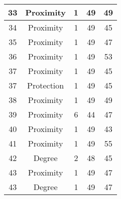 \documentclass[results.tex]{subfiles}
\begin{document}
\begin{center}
\begin{tabular}{| c || c | c | c | c |}
            \hline
            33                      & Proximity                    & 1                      & 49                      & 49                   \\
            \hline
            34                      & Proximity                    & 1                      & 49                      & 45                   \\
            \hline
            35                      & Proximity                    & 1                      & 49                      & 47                   \\
            \hline
            36                      & Proximity                    & 1                      & 49                      & 53                   \\
            \hline
            37                      & Proximity                    & 1                      & 49                      & 45                   \\
            \hline
            37                      & Protection                   & 1                      & 49                      & 45                   \\
            \hline
            38                      & Proximity                    & 1                      & 49                      & 49                   \\
            \hline
            39                      & Proximity                    & 6                      & 44                      & 47                   \\
            \hline
            40                      & Proximity                    & 1                      & 49                      & 43                   \\
            \hline
            41                      & Proximity                    & 1                      & 49                      & 55                   \\
            \hline
            42                      & Degree                       & 2                      & 48                      & 45                   \\
            \hline
            43                      & Proximity                    & 1                      & 49                      & 47                   \\
            \hline
            43                      & Degree                       & 1                      & 49                      & 47                   \\

\end{tabular}
\end{center}
\end{document}
